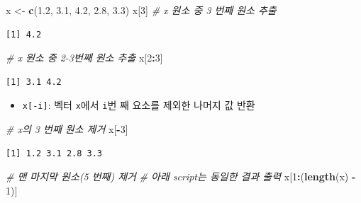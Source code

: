 \documentclass[
  11pt,
]{krantz}
\newenvironment{Shaded}{\begin{snugshade}}{\end{snugshade}}
\newcommand{\CommentTok}[1]{\textcolor[rgb]{0.37,0.37,0.37}{\textit{#1}}}
\newcommand{\DecValTok}[1]{\textcolor[rgb]{0.06,0.06,0.06}{#1}}
\newcommand{\FloatTok}[1]{\textcolor[rgb]{0.06,0.06,0.06}{#1}}
\newcommand{\KeywordTok}[1]{\textcolor[rgb]{0.27,0.27,0.27}{\textbf{#1}}}
\newcommand{\NormalTok}[1]{#1}
\newcommand{\OperatorTok}[1]{\textcolor[rgb]{0.43,0.43,0.43}{\textbf{#1}}}
\newcommand{\StringTok}[1]{\textcolor[rgb]{0.5,0.5,0.5}{#1}}
\providecommand{\tightlist}{%
  \setlength{\itemsep}{0pt}\setlength{\parskip}{0pt}}
\begin{document}
\footnotesize

\begin{Shaded}
\begin{Highlighting}[]
\NormalTok{x <-}\StringTok{ }\KeywordTok{c}\NormalTok{(}\FloatTok{1.2}\NormalTok{, }\FloatTok{3.1}\NormalTok{, }\FloatTok{4.2}\NormalTok{, }\FloatTok{2.8}\NormalTok{, }\FloatTok{3.3}\NormalTok{)}
\NormalTok{x[}\DecValTok{3}\NormalTok{] }\CommentTok{# x 원소 중 3 번째 원소 추출}
\end{Highlighting}
\end{Shaded}

\begin{verbatim}
[1] 4.2
\end{verbatim}

\begin{Shaded}
\begin{Highlighting}[]
\CommentTok{# x 원소 중 2-3번째 원소 추출}
\NormalTok{x[}\DecValTok{2}\OperatorTok{:}\DecValTok{3}\NormalTok{]}
\end{Highlighting}
\end{Shaded}

\begin{verbatim}
[1] 3.1 4.2
\end{verbatim}

\normalsize

\begin{itemize}
\tightlist
\item
  \texttt{x{[}-i{]}}: 벡터 \texttt{x}에서 \texttt{i}번 째 요소를 제외한 나머지 값 반환
\end{itemize}

\footnotesize

\begin{Shaded}
\begin{Highlighting}[]
\CommentTok{# x의 3 번째 원소 제거}
\NormalTok{x[}\OperatorTok{-}\DecValTok{3}\NormalTok{]}
\end{Highlighting}
\end{Shaded}

\begin{verbatim}
[1] 1.2 3.1 2.8 3.3
\end{verbatim}

\begin{Shaded}
\begin{Highlighting}[]
\CommentTok{# 맨 마지막 원소(5 번째) 제거}
\CommentTok{# 아래 script는 동일한 결과 출력}
\NormalTok{x[}\DecValTok{1}\OperatorTok{:}\NormalTok{(}\KeywordTok{length}\NormalTok{(x) }\OperatorTok{-}\StringTok{ }\DecValTok{1}\NormalTok{)]}
\end{Highlighting}
\end{Shaded}
\end{document}
